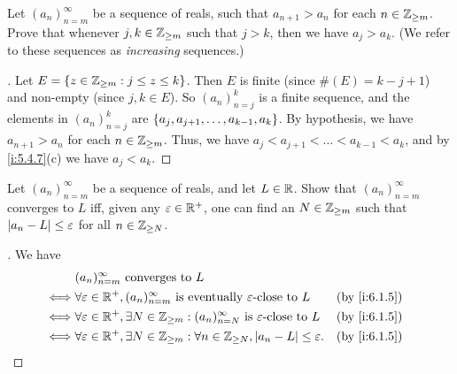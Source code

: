 \exercisesection

\begin{ex}\label{i:ex:6.1.1}
  Let \((a_n)_{n = m}^\infty\) be a sequence of reals, such that \(a_{n + 1} > a_n\) for each \(n \in \mathbb{Z}_{\geq m}\).
  Prove that whenever \(j, k \in \mathbb{Z}_{\geq m}\) such that \(j > k\), then we have \(a_j > a_k\).
  (We refer to these sequences as \emph{increasing} sequences.)
\end{ex}

\begin{proof}[]
  Let \(E = \left\lbrace z \in \mathbb{Z}_{\geq m} : j \leq z \leq k\right\rbrace\).
  Then \(E\) is finite (since \(\#(E) = k - j + 1\)) and non-empty (since \(j, k \in E\)).
  So \((a_n)_{n = j}^k\) is a finite sequence, and the elements in \((a_n)_{n = j}^k\) are \(\left\lbrace a_j, a_{j + 1}, \dots, a_{k - 1}, a_k\right\rbrace\).
  By hypothesis, we have \(a_{n + 1} > a_n\) for each \(n \in \mathbb{Z}_{\geq m}\).
  Thus, we have \(a_j < a_{j + 1} < \dots < a_{k - 1} < a_k\), and by \cref{i:5.4.7}(c) we have \(a_j < a_k\).
\end{proof}

\begin{ex}\label{i:ex:6.1.2}
  Let \((a_n)_{n = m}^\infty\) be a sequence of reals, and let \(L \in \mathbb{R}\).
  Show that \((a_n)_{n = m}^\infty\) converges to \(L\) iff, given any \(\varepsilon \in \mathbb{R}^+\), one can find an \(N \in \mathbb{Z}_{\geq m}\) such that \(\left\lvert a_n - L\right\rvert \leq \varepsilon\) for all \(n \in \mathbb{Z}_{\geq N}\).
\end{ex}

\begin{proof}[]
  We have
  \begin{align*}
         & (a_n)_{n = m}^\infty \text{ converges to } L                                                                                                \\
    \iff & \forall \varepsilon \in \R^+, (a_n)_{n = m}^\infty \text{ is eventually } \varepsilon\text{-close to } L                  &  & \by{i:6.1.5} \\
    \iff & \forall \varepsilon \in \R^+, \exists N \in \Z_{\geq m} : (a_n)_{n = N}^\infty \text{ is } \varepsilon\text{-close to } L &  & \by{i:6.1.5} \\
    \iff & \forall \varepsilon \in \R^+, \exists N \in \Z_{\geq m} : \forall n \in \Z_{\geq N}, \abs{a_n - L} \leq \varepsilon.      &  & \by{i:6.1.5}
  \end{align*}
\end{proof}

